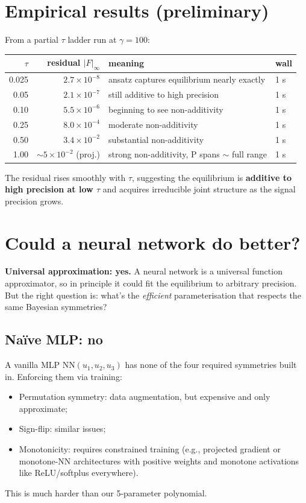 \documentclass[11pt]{article}
\begin{document}
\section{Empirical results (preliminary)}

From a partial $\tau$ ladder run at $\gamma = 100$:
\begin{center}
\begin{tabular}{rrll}
\toprule
$\tau$ & residual $|F|_\infty$ & meaning & wall \\
\midrule
0.025 & $2.7 \times 10^{-8}$ & ansatz captures equilibrium nearly exactly & 1 s \\
0.05  & $2.1 \times 10^{-7}$ & still additive to high precision & 1 s \\
0.10  & $5.5 \times 10^{-6}$ & beginning to see non-additivity & 1 s \\
0.25  & $8.0 \times 10^{-4}$ & moderate non-additivity & 1 s \\
0.50  & $3.4 \times 10^{-2}$ & substantial non-additivity & 1 s \\
1.00  & $\sim 5 \times 10^{-2}$ (proj.) & strong non-additivity, P spans $\sim$ full range & 1 s \\
\bottomrule
\end{tabular}
\end{center}

The residual rises smoothly with $\tau$, suggesting the equilibrium is
\textbf{additive to high precision at low $\tau$} and acquires irreducible
joint structure as the signal precision grows.

\section{Could a neural network do better?}

\textbf{Universal approximation: yes.} A neural network is a universal
function approximator, so in principle it could fit the equilibrium to
arbitrary precision. But the right question is: what's the
\emph{efficient} parameterisation that respects the same Bayesian
symmetries?

\subsection{Naïve MLP: no}

A vanilla MLP $\mathrm{NN}(u_1, u_2, u_3)$ has none of the four required
symmetries built in. Enforcing them via training:
\begin{itemize}
  \item Permutation symmetry: data augmentation, but expensive and only
        approximate;
  \item Sign-flip: similar issues;
  \item Monotonicity: requires constrained training (e.g., projected
        gradient or monotone-NN architectures with positive weights and
        monotone activations like ReLU/softplus everywhere).
\end{itemize}
This is much harder than our 5-parameter polynomial.
\end{document}
